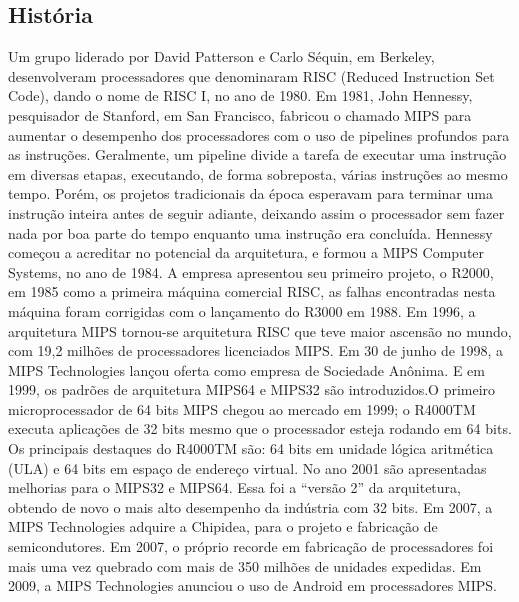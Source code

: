 \documentclass[12pt,a4paper]{article}
\begin{document}
\subsection{História}
Um grupo liderado por David Patterson e Carlo Séquin, em Berkeley, desenvolveram processadores que denominaram RISC (Reduced Instruction Set Code), dando o nome de RISC I, no ano de 1980. Em 1981, John Hennessy, pesquisador de Stanford, em San Francisco, fabricou o chamado MIPS para aumentar o desempenho dos processadores com o uso de pipelines profundos para as instruções. Geralmente, um pipeline divide a tarefa de executar uma instrução em diversas etapas, executando, de forma sobreposta, várias instruções ao mesmo tempo. Porém, os projetos tradicionais da época esperavam para terminar uma instrução inteira antes de seguir adiante, deixando assim o processador sem fazer nada por boa parte do tempo enquanto uma instrução era concluída.
	Hennessy começou a acreditar no potencial da arquitetura, e formou a MIPS Computer Systems, no ano de 1984. A empresa apresentou seu primeiro projeto, o R2000, em 1985 como a primeira máquina comercial RISC, as falhas encontradas nesta máquina foram corrigidas com o lançamento do R3000 em 1988. Em 1996, a arquitetura MIPS tornou-se arquitetura RISC que teve maior ascensão no mundo, com 19,2 milhões de processadores licenciados MIPS. Em 30 de junho de 1998, a MIPS Technologies lançou oferta como empresa de Sociedade Anônima. E em 1999, os padrões de arquitetura MIPS64 e MIPS32 são introduzidos.O primeiro microprocessador de 64 bits  MIPS chegou ao mercado em 1999; o R4000TM executa aplicações de 32 bits mesmo que o processador esteja rodando em 64 bits. Os principais destaques do R4000TM são: 64 bits em unidade lógica aritmética (ULA) e 64 bits em espaço de endereço virtual.
	No ano 2001 são apresentadas melhorias para o MIPS32 e MIPS64. Essa foi a “versão 2” da arquitetura, obtendo de novo o mais alto desempenho da indústria com 32 bits. Em 2007, a MIPS Technologies adquire a Chipidea, para o projeto e fabricação de semicondutores. Em 2007, o próprio recorde em fabricação de processadores foi mais uma vez quebrado com mais de 350 milhões de unidades expedidas. Em 2009, a MIPS Technologies anunciou o uso de Android em processadores MIPS.
\end{document}
